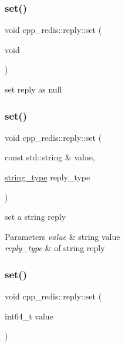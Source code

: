 \subsubsection{\texorpdfstring{set()}{set()}\hspace{0.1cm}{\footnotesize\ttfamily [1/4]}}
{\footnotesize\ttfamily void cpp\+\_\+redis\+::reply\+::set (\begin{DoxyParamCaption}\item[{void}]{ }\end{DoxyParamCaption})}

set reply as null \mbox{\label{classcpp__redis_1_1reply_a9306dcc36a6a009a2b0f4923735f6349}} 
\subsubsection{\texorpdfstring{set()}{set()}\hspace{0.1cm}{\footnotesize\ttfamily [2/4]}}
{\footnotesize\ttfamily void cpp\+\_\+redis\+::reply\+::set (\begin{DoxyParamCaption}\item[{const std\+::string \&}]{value,  }\item[{\hyperlink{classcpp__redis_1_1reply_ac192ba4cb8f2bb6e7cb465edf755328b}{string\+\_\+type}}]{reply\+\_\+type }\end{DoxyParamCaption})}

set a string reply


\begin{DoxyParams}{Parameters}
{\em value} & string value \\
\hline
{\em reply\+\_\+type} & of string reply \\
\hline
\end{DoxyParams}
\mbox{\label{classcpp__redis_1_1reply_a2443bd6d4fb35279db198ba876e1ad34}} 
\subsubsection{\texorpdfstring{set()}{set()}\hspace{0.1cm}{\footnotesize\ttfamily [3/4]}}
{\footnotesize\ttfamily void cpp\+\_\+redis\+::reply\+::set (\begin{DoxyParamCaption}\item[{int64\+\_\+t}]{value }\end{DoxyParamCaption})}

